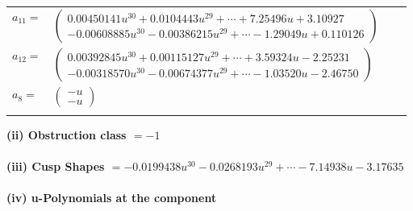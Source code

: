 \documentclass[1p]{elsarticle_modified}
\theoremstyle{definition}
\begin{document}
\begin{tabular}{m{7pt} m{180pt} m{7pt} m{180pt} }
\flushright $a_{11}=$&$\begin{pmatrix}0.00450141 u^{30}+0.0104443 u^{29}+\cdots+7.25496 u+3.10927\\-0.00608885 u^{30}-0.00386215 u^{29}+\cdots-1.29049 u+0.110126\end{pmatrix}$ \\
\flushright $a_{12}=$&$\begin{pmatrix}0.00392845 u^{30}+0.00115127 u^{29}+\cdots+3.59324 u-2.25231\\-0.00318570 u^{30}-0.00674377 u^{29}+\cdots-1.03520 u-2.46750\end{pmatrix}$ \\
\flushright $a_{8}=$&$\begin{pmatrix}- u\\- u\end{pmatrix}$\\&\end{tabular}
\flushleft \textbf{(ii) Obstruction class $= -1$}\\~\\
\flushleft \textbf{(iii) Cusp Shapes $= -0.0199438 u^{30}-0.0268193 u^{29}+\cdots-7.14938 u-3.17635$}\\~\\
\newpage\renewcommand{\arraystretch}{1}
\flushleft \textbf{(iv) u-Polynomials at the component}\newline \\
\end{document}
